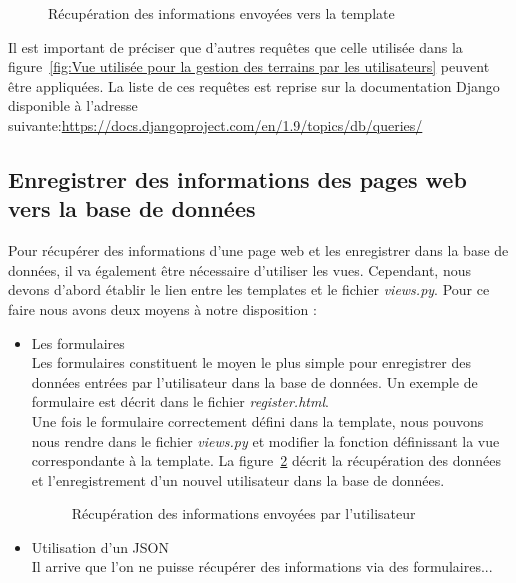 \begin{figure}[!ht]
\centering
\begin{framed}

\end{framed}
\caption{Récupération des informations envoyées vers la template}
\label{fig:Récupération des informations envoyées vers la template}
\end{figure}
\FloatBarrier

Il est important de préciser que d'autres requêtes que celle utilisée dans la figure~\ref{fig:Vue utilisée pour la gestion des terrains par les utilisateurs} peuvent être appliquées. La liste de ces requêtes est reprise sur la documentation Django disponible à l'adresse suivante:\url{https://docs.djangoproject.com/en/1.9/topics/db/queries/}

\subsection{Enregistrer des informations des pages web vers la base de données}

Pour récupérer des informations d'une page web et les enregistrer dans la base de données, il va également être nécessaire d'utiliser les vues. Cependant, nous devons d'abord établir le lien entre les templates et le fichier \textit{views.py}. Pour ce faire nous avons deux moyens à notre disposition : \\

\begin{itemize}
\item Les formulaires\\

Les formulaires constituent le moyen le plus simple pour enregistrer des données entrées par l'utilisateur dans la base de données. Un exemple de formulaire est décrit dans le fichier \textit{register.html}.\\

Une fois le formulaire correctement défini dans la template, nous pouvons nous rendre dans le fichier \textit{views.py} et modifier la fonction définissant la vue correspondante à la template. La figure~\ref{fig:Récupération des informations envoyées par l'utilisateur} décrit la récupération des données et l'enregistrement d'un nouvel utilisateur dans la base de données. 

\begin{figure}[!ht]
\centering
\begin{framed}

\end{framed}
\caption{Récupération des informations envoyées par l'utilisateur}
\label{fig:Récupération des informations envoyées par l'utilisateur}
\end{figure}
\FloatBarrier

\item Utilisation d'un JSON\\

Il arrive que l'on ne puisse récupérer des informations via des formulaires...

\end{itemize}
